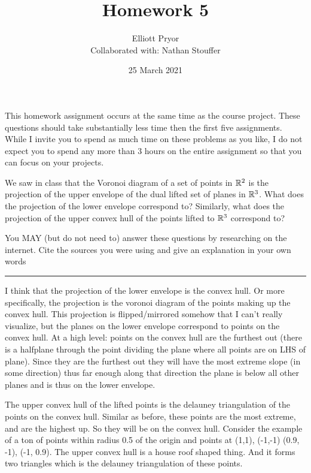 \documentclass[11pt]{article}
\title{Homework 5}
\author{Elliott Pryor \\
Collaborated with: Nathan Stouffer}
\date{25 March 2021}
\begin{document}
\maketitle

This homework assignment occurs at the same time as the course project.  These
questions should take substantially less time then the first five assignments.
While I invite you to spend as much time on these problems as you like, I do not
expect you to spend any more than 3 hours on the entire assignment so that you
can focus on your projects.



We saw in class that the Voronoi diagram of a set of points in $\mathbb{R}^2$ is the
projection of the upper envelope of the dual lifted set of planes in $\mathbb{R}^3$.
What does the projection of the lower envelope correspond to? Similarly, what
does the projection of the upper convex hull of the points lifted to $\mathbb{R}^3$
correspond to?

You MAY (but do not need to) answer these questions by researching on the
internet. Cite the sources you were using and give an explanation in your own
words

\hrule

I think that the projection of the lower envelope is the convex hull.
Or more specifically, the projection is the voronoi diagram of the points making up the convex hull.
This projection is flipped/mirrored somehow that I can't really visualize, but the 
planes on the lower envelope correspond to points on the convex hull.
At a high level: points on the convex hull are the furthest out (there is a halfplane through
the point dividing the plane where all points are on LHS of plane). 
Since they are the furthest out they will have the most extreme slope (in some direction)
thus far enough along that direction the plane is below all other planes and is thus on the lower envelope.



The upper convex hull of the lifted points is the delauney triangulation of the points
on the convex hull. Similar as before, these points are the most extreme, and are the highest up. 
So they will be on the convex hull. 
Consider the example of a ton of points within radius 0.5 of the origin and points at (1,1), (-1,-1)
(0.9, -1), (-1, 0.9). The upper convex hull is a house roof shaped thing. And it forms
two triangles which is the delauney triangulation of these points.
\end{document}
